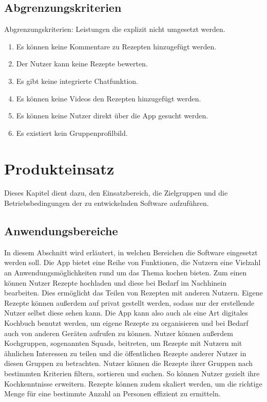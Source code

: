 \documentclass[parskip=full]{scrartcl}
\begin{document}
\subsection{Abgrenzungskriterien}
Abgrenzungskriterien: Leistungen die explizit nicht umgesetzt werden.

\begin{enumerate}[start=1,label={$\langle$\bfseries RW\arabic*$\rangle$}, leftmargin = 5em, itemsep=4pt, parsep=4pt]
    \item Es können keine Kommentare zu Rezepten hinzugefügt werden.
    \item Der Nutzer kann keine Rezepte bewerten.
    \item Es gibt keine integrierte Chatfunktion.
    \item Es können keine Videos den Rezepten hinzugefügt werden.
    \item Es können keine Nutzer direkt über die App gesucht werden.
    \item Es existiert kein Gruppenprofilbild.
\end{enumerate}

\section{Produkteinsatz}
Dieses Kapitel dient dazu, den Einsatzbereich, die Zielgruppen und die Betriebsbedingungen der zu entwickelnden Software aufzuführen.

\subsection{Anwendungsbereiche}
In diesem Abschnitt wird erläutert, in welchen Bereichen die Software eingesetzt werden soll. \newline
Die App bietet eine Reihe von Funktionen, die Nutzern eine Vielzahl an Anwendungsmöglichkeiten rund um das Thema kochen bieten. 
Zum einen können Nutzer Rezepte hochladen und diese bei Bedarf im Nachhinein bearbeiten. 
Dies ermöglicht das Teilen von Rezepten mit anderen Nutzern. Eigene Rezepte können außerdem auf privat gestellt werden, sodass nur der erstellende Nutzer selbst diese sehen kann.
Die App kann also auch als eine Art digitales Kochbuch benutzt werden, um eigene Rezepte zu organisieren und bei Bedarf auch von anderen Geräten aufrufen zu können.  
Nutzer können außerdem Kochgruppen, sogenannten Squads, beitreten, um Rezepte mit Nutzern mit ähnlichen Interessen zu teilen und die öffentlichen Rezepte anderer Nutzer in diesen Gruppen zu betrachten. Nutzer können die Rezepte ihrer Gruppen nach bestimmten Kriterien filtern, sortieren und suchen. So können Nutzer gezielt ihre Kochkenntnisse erweitern.
Rezepte können zudem skaliert werden, um die richtige Menge für eine bestimmte Anzahl an Personen effizient zu ermitteln. 
\end{document}
